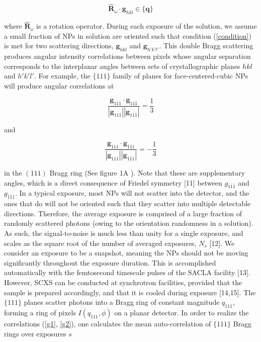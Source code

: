 \documentclass [11pt,fleqn]{article}
\def \be {\begin{equation}}
\def \ee {\end{equation}}
\begin{document}
\be \label{condition}
\hat{\bm R}_\omega \cdot \bm g_{hkl} \in \{\bm q\}
\ee

where $\hat{\bm R}_\omega$ is a rotation operator. During each exposure of the solution, we assume a small fraction of NPs in solution are oriented such that condition (\ref{condition}) is met for two scattering directions, $\bm g_{hkl}$ and $\bm g_{h'k'l'}$. This double Bragg scattering produces angular intensity correlations between pixels whose angular separation corresponds to the interplanar angles between sets of crystallographic planes $hkl$ and $h'k'l'$. For example, the $\{111\}$ family of planes for face-centered-cubic NPs will produce angular correlations at

\be \label{g1}
\frac{\bm g_{111} \cdot \bm g_{11\bar{1}}}{|\bm g_{111}| |\bm g_{11\bar{1}}| } = \frac{1}{3}
\ee

and

\be \label {g2}
\frac{\bm g_{111} \cdot \bm g_{\bar{1}\bar{1}1}}{|\bm g_{111}| |\bm g_{\bar{1}\bar{1}1}| } = -\frac{1}{3}
\ee

in the $(111)$ Bragg ring (See figure 1A ). Note that these are supplementary angles, which is a direct consequence of Friedel symmetry [11] between $g_{11\bar{1}}$ and $g_{\bar{1}\bar{1}1}$.
In a typical exposure, most NPs will not scatter into the detector, and the ones that do will not be oriented such that they scatter into multiple detectable directions. Therefore, the average exposure is comprised of a large fraction of randomly scattered photons (owing to the orientation randomness in  a solution). As such, the signal-to-noise is much less than unity for a single exposure, and scales as the square root of the number of averaged exposures, $N_s$ [12]. We consider an exposure to be a snapshot, meaning the NPs should not be moving significantly throughout the exposure duration. This is accomplished automatically with the femtosecond timescale pulses of the SACLA facility [13]. However, SCXS can be conducted at synchrotron facilities, provided  that the sample is prepared accordingly, and that it is cooled during exposure [14,15]. The $\{111\}$ planes scatter photons into a Bragg ring of constant magnitude $q_{111}$, forming a ring of pixels $I(q_{111},\phi)$ on a planar detector. In order to realize the correlations (\ref{g1}, \ref{g2}), one calculates the mean auto-correlation of $\{111\}$ Bragg rings over exposures $s$
\end{document}
